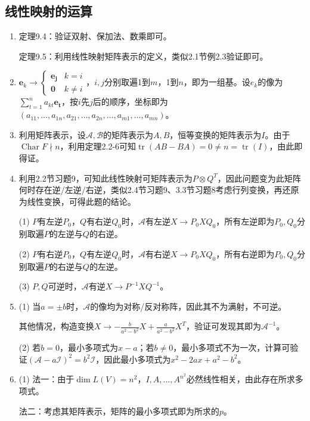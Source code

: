 \documentclass[a4paper,UTF8,fontset=windows]{ctexart}
\DeclareMathOperator{\Char}{Char}
\DeclareMathOperator{\tr}{tr}
\begin{document}
\subsection{线性映射的运算}
\begin{enumerate}
\item
定理9.4：验证双射、保加法、数乘即可。

定理9.5：利用线性映射矩阵表示的定义，类似2.1节例2.3验证即可。

\item
$\mathbf{e}_k\to\begin{cases}\mathbf{e_j}&k=i\\\mathbf{0}&k\ne i\end{cases}$，$i,j$分别取遍1到$m$，1到$n$，即为一组基。设$e_k$的像为$\sum_{t=1}^na_{kt}\mathbf{e_t}$，按$i$先$j$后的顺序，坐标即为$(a_{11},\dots,a_{1n},a_{21},\dots,a_{2n},\dots,a_{m1},\dots,a_{mn})$。

\item
利用矩阵表示，设$\mathcal{A},\mathcal{B}$的矩阵表示为$A,B$，恒等变换的矩阵表示为$I$。由于$\Char F\nmid n$，利用定理2.2-6可知$\tr(AB-BA)=0\ne n=\tr(I)$，由此即得证。

\item
利用2.2节习题9，可知此线性映射可矩阵表示为$P\otimes Q^T$，因此问题变为此矩阵何时存在逆/左逆/右逆，类似2.4节习题9、3.3节习题8考虑行列变换，再还原为线性变换，可得此题的结论。

(1) $P$有左逆$P_0$，$Q$有右逆$Q_0$时，$\mathcal{A}$有左逆$X\to P_0XQ_0$，所有左逆即为$P_0,Q_0$分别取遍$P$的左逆与$Q$的右逆。

(2) $P$有右逆$P_0$，$Q$有左逆$Q_0$时，$\mathcal{A}$有右逆$X\to P_0XQ_0$，所有右逆即为$P_0,Q_0$分别取遍$P$的右逆与$Q$的左逆。

(3) $P,Q$可逆时，$\mathcal{A}$有逆$X\to P^{-1}XQ^{-1}$。

\item
(1) 当$a=\pm b$时，$\mathcal{A}$的像均为对称/反对称阵，因此其不为满射，不可逆。

其他情况，构造变换$X\to-\frac{b}{a^2-b^2}X+\frac{a}{a^2-b^2}X^T$，验证可发现其即为$\mathcal{A}^{-1}$。

(2) 若$b=0$，最小多项式为$x-a$；若$b\ne0$，最小多项式不为一次，计算可验证$(\mathcal{A}-a\mathcal{I})^2=b^2\mathcal{I}$，因此最小多项式为$x^2-2ax+a^2-b^2$。

\item
(1) 法一：由于$\dim L(V)=n^2$，$I,A,\dots,A^{n^2}$必然线性相关，由此存在所求多项式。

法二：考虑其矩阵表示，矩阵的最小多项式即为所求的$p$。


\end{enumerate}
\end{document}
